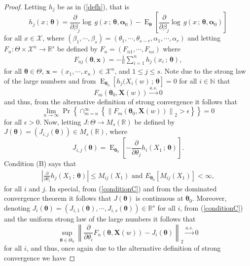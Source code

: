 \documentclass[10pt,a4paper,onecolumn]{article} %
\newcommand{\f}{\on}
\newcommand{\R}{\mathbb{R}}
\newcommand{\bs}{\boldsymbol}
\newcommand{\on}{\operatorname}
\begin{document}
\begin{appendix}
\begin{proof}
Letting $h_j$ be as in (\ref{defh}), that is
\begin{equation*}
h_j(x\,;\,\bs{\theta}) = \frac{\partial}{\partial \beta_j}\log\, g \left(x\,;\,\bs{\theta},\bs{\alpha}_0\right) - \on{E}_{\bs{\theta}}\left[\frac{\partial}{\partial \beta_j}\log\, g \left(x\,;\,\bs{\theta},\bs{\alpha}_0\right)\right]
\end{equation*}
for all $x\in \mathcal{X}$, where $(\beta_1,\cdots,\beta_s)=(\theta_1,\cdots,\theta_{s-r},\alpha_1,\cdots,\alpha_r)$ and letting $F_n:\Theta\times \mathcal{X}^n\to \mathbb{R}^s$ be defined by $F_n = \left(F_{n1},\cdots,F_{ns}\right)$ where
\begin{equation*}
\begin{aligned}F_{nj}(\bs{\theta},\bs{x})=-\frac{1}{n}\sum_{i=1}^n h_j \left(x_i\,;\,\bs{\theta}\right),
\end{aligned}
\end{equation*}
for all $\bs{\theta}\in \Theta$, $\bs{x}=(x_1,\cdots,x_n)\in \mathcal{X}^n$, and $1\leq j\leq s$. Note due to the strong law of the large numbers and from $\on{E}_{\bs{\theta}_0}\left[h_j(X_i(w)\, ;\, \bs{\theta} \right] = 0$ for all $i\in \mathbb{N}$ that
\begin{equation*} F_m(\bs{\theta}_0,\bs{X}(w))\overset{a.s.}{\to} 0
\end{equation*}
and thus, from the alternative definition of strong convergence it follows that
\begin{equation}\label{weak} \lim_{n\to \infty} \f{Pr}\left\{\cap_{m=n}^\infty\left\{\left\|F_{m}(\bs{\theta}_0,\bs{X}(w))\right\|_2>\epsilon\right\}\right\} = 0
\end{equation}
for all $\epsilon>0$. Now, letting $J:\Theta\to M_s(\mathbb{R})$ be defined by $J(\bs{\theta})=\left(J_{i,j}(\bs{\theta})\right)\in M_s(\mathbb{R})$, where
\begin{equation*}J_{i,j}(\bs{\theta})=
 \on{E}_{\bs{\theta}_0} \left[-\frac{\partial}{\partial\theta_j}h_i(X_1\, ;\, \bs{\theta})\right].
\end{equation*}
Condition (B) says that
\begin{equation}\label{conditionC}
 \begin{aligned}
 \left|\frac{\partial}{\partial \theta_i}h_j(X_1\, ;\, \bs{\theta})\right|\leq M_{ij}(X_1)\mbox{ and }E_{\bs{\theta}_0}\left[M_{ij}(X_1)\right]<\infty,
 \end{aligned}
 \end{equation}
for all $i$ and $j$. In special, from (\ref{conditionC}) and from the dominated convergence theorem it follows that $J(\bs{\theta})$ is continuous at $\bs{\theta}_0$. Moreover, denoting $J_i(\bs{\theta})=\left(J_{i,1}(\bs{\theta}),\cdots,J_{i,s}(\bs{\theta})\right)\in \R^s$ for all $i$, from (\ref{conditionC}) and the uniform strong law of the large numbers it follows that
\begin{equation*}\sup_{\bs{\theta}\in \overline{\Theta}_0}\left\|\frac{\partial }{\partial \theta_i}F_n(\bs{\theta},\bs{X}(w)) - J_i(\bs{\theta})\right\|_2 \overset{a.s.}{\to} 0
\end{equation*}
for all $i$, and thus, once again due to the alternative definition of strong convergence we have


\end{proof}
\end{appendix}
\end{document}
